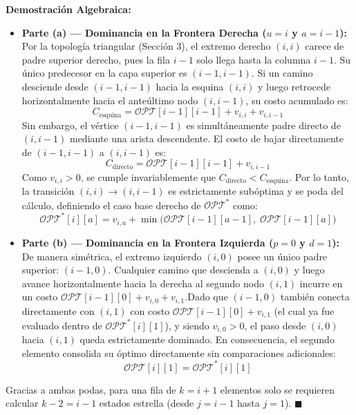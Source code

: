 \textbf{Demostración Algebraica:}
\begin{itemize}
    \item \textbf{Parte (a) — Dominancia en la Frontera Derecha ($u = i$ y $a = i-1$):} \\
    Por la topología triangular (Sección 3), el extremo derecho $(i, i)$ carece de padre superior derecho, pues la fila $i-1$ solo llega hasta la columna $i-1$. Su único predecesor en la capa superior es $(i-1, i-1)$. Si un camino desciende desde $(i-1, i-1)$ hacia la esquina $(i, i)$ y luego retrocede horizontalmente hacia el anteúltimo nodo $(i, i-1)$, su costo acumulado es:
    \[
        C_{\text{esquina}} = \mathcal{OPT}[i-1][i-1] + v_{i,i} + v_{i,i-1}
    \]
    Sin embargo, el vértice $(i-1, i-1)$ es simultáneamente padre directo de $(i, i-1)$ mediante una arista descendente. El costo de bajar directamente de $(i-1, i-1)$ a $(i, i-1)$ es:
    \[
        C_{\text{directo}} = \mathcal{OPT}[i-1][i-1] + v_{i,i-1}
    \]
    Como $v_{i,i} > 0$, se cumple invariablemente que $C_{\text{directo}} < C_{\text{esquina}}$. Por lo tanto, la transición $(i, i) \to (i, i-1)$ es estrictamente subóptima y se poda del cálculo, definiendo el caso base derecho de $\mathcal{OPT}^*$ como:
    \[
        \mathcal{OPT}^*[i][a] = v_{i,a} + \min\big(\mathcal{OPT}[i-1][a-1], \; \mathcal{OPT}[i-1][a]\big)
    \]

    \item \textbf{Parte (b) — Dominancia en la Frontera Izquierda ($p = 0$ y $d = 1$):} \\
    De manera simétrica, el extremo izquierdo $(i, 0)$ posee un único padre superior: $(i-1, 0)$. Cualquier camino que descienda a $(i, 0)$ y luego avance horizontalmente hacia la derecha al segundo nodo $(i, 1)$ incurre en un costo $\mathcal{OPT}[i-1][0] + v_{i,0} + v_{i,1}$.Dado que $(i-1, 0)$ también conecta directamente con $(i, 1)$ con costo $\mathcal{OPT}[i-1][0] + v_{i,1}$ (el cual ya fue evaluado dentro de $\mathcal{OPT}^*[i][1]$), y siendo $v_{i,0} > 0$, el paso desde $(i,0)$ hacia $(i,1)$ queda estrictamente dominado. En consecuencia, el segundo elemento consolida su óptimo directamente sin comparaciones adicionales:
    \[
        \mathcal{OPT}[i][1] = \mathcal{OPT}^*[i][1]
    \]
\end{itemize}
Gracias a ambas podas, para una fila de $k = i+1$ elementos solo se requieren calcular $k - 2 = i - 1$ estados estrella (desde $j = i-1$ hasta $j = 1$). $\blacksquare$

